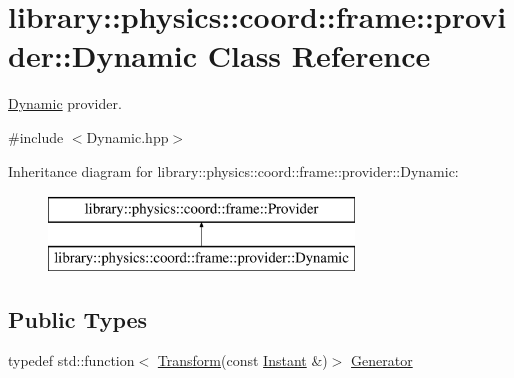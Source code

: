\hypertarget{classlibrary_1_1physics_1_1coord_1_1frame_1_1provider_1_1_dynamic}{}\section{library\+:\+:physics\+:\+:coord\+:\+:frame\+:\+:provider\+:\+:Dynamic Class Reference}
\label{classlibrary_1_1physics_1_1coord_1_1frame_1_1provider_1_1_dynamic}


\hyperlink{classlibrary_1_1physics_1_1coord_1_1frame_1_1provider_1_1_dynamic}{Dynamic} provider.  




{\ttfamily \#include $<$Dynamic.\+hpp$>$}

Inheritance diagram for library\+:\+:physics\+:\+:coord\+:\+:frame\+:\+:provider\+:\+:Dynamic\+:\begin{figure}[H]
\begin{center}
\leavevmode
\includegraphics[height=2.000000cm]{classlibrary_1_1physics_1_1coord_1_1frame_1_1provider_1_1_dynamic}
\end{center}
\end{figure}
\subsection*{Public Types}
\begin{DoxyCompactItemize}
\item 
typedef std\+::function$<$ \hyperlink{classlibrary_1_1physics_1_1coord_1_1_transform}{Transform}(const \hyperlink{classlibrary_1_1physics_1_1time_1_1_instant}{Instant} \&)$>$ \hyperlink{classlibrary_1_1physics_1_1coord_1_1frame_1_1provider_1_1_dynamic_a143db93d5b57faf0e91a812f4203a630}{Generator}
\end{DoxyCompactItemize}

